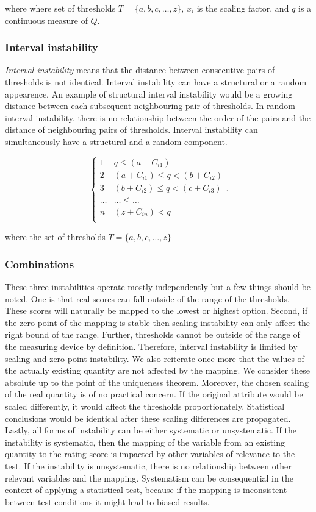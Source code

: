 \documentclass[utf8]{FrontiersinVancouver}
\begin{document}
where where set of thresholds $T = \{a, b, c, \ldots, z\}$, $x_{i}$ is the scaling factor, and $q$ is a continuous measure of $Q$.

\subsubsection{Interval instability}
\textit{Interval instability} means that the distance between consecutive pairs of thresholds is not identical. Interval instability can have a structural or a random appearence. An example of structural interval instability would be a growing distance between each subsequent neighbouring pair of thresholds. In random interval instability, there is no relationship between the order of the pairs and the distance of neighbouring pairs of thresholds. Interval instability can simultaneously have a structural and a random component.

\[
\begin{cases} 
    1 & q  \leq (a + C_{i1})\\
    2 & (a + C_{i1}) \leq q < (b + C_{i2})\\
    3 & (b + C_{i2})  \leq q < (c + C_{i3})\\
    \ldots & \ldots \leq \ldots\\    
    n & (z + C_{in}) < q\\
\end{cases}.
\]


where the set of thresholds $T = \{a, b, c, \ldots, z\}$

\subsubsection{Combinations}
These three instabilities operate mostly independently but a few things should be noted. One is that real scores can fall outside of the range of the thresholds. These scores will naturally be mapped to the lowest or highest option. Second, if the zero-point of the mapping is stable then scaling instability can only affect the right bound of the range. Further, thresholds cannot be outside of the range of the measuring device by definition. Therefore, interval instability is limited by scaling and zero-point instability. We also reiterate once more that the values of the actually existing quantity are not affected by the mapping. We consider these absolute up to the point of the uniqueness theorem. Moreover, the chosen scaling of the real quantity is of no practical concern. If the original attribute would be scaled differently, it would affect the thresholds proportionately. Statistical conclusions would be identical after these scaling differences are propagated. Lastly, all forms of instability can be either systematic or unsystematic. If the instability is systematic, then the mapping of the variable from an existing quantity to the rating score is impacted by other variables of relevance to the test. If the instability is unsystematic, there is no relationship between other relevant variables and the mapping. Systematism can be consequential in the context of applying a statistical test, because if the mapping is inconsistent between test conditions it might lead to biased results. 
\end{document}
